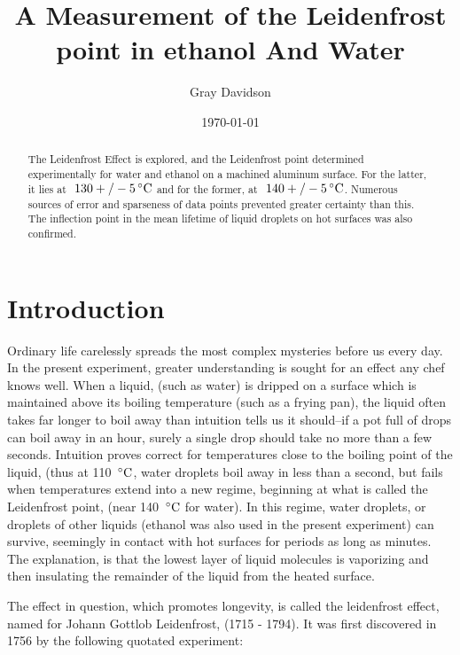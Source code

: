 \documentclass[aps,pre,twocolumn,nofootinbib]{revtex4}
\begin{document}
\title{A Measurement of the Leidenfrost point in ethanol And Water}

\author{Gray Davidson}
\date{\today}

\begin{abstract}  
The Leidenfrost Effect is explored, and the Leidenfrost point determined experimentally for water and ethanol on a machined aluminum surface.  For the latter, it lies at $~130 +/- 5\,^{\circ}{\rm C}$ and for the former, at $~140 +/- 5\,^{\circ}{\rm C}$.  Numerous sources of error and sparseness of data points prevented greater certainty than this.  The inflection point in the mean lifetime of liquid droplets on hot surfaces was also confirmed.  

\end{abstract}
\maketitle

\section{Introduction}
Ordinary life carelessly spreads the most complex mysteries before us every day.  In the present experiment, greater understanding is sought for an effect any chef knows well.  When a liquid, (such as water) is dripped on a surface which is maintained above its boiling temperature (such as a frying pan), the liquid often takes far longer to boil away than intuition tells us it should--if a pot full of drops can boil away in an hour, surely a single drop should take no more than a few seconds.  Intuition proves correct for temperatures close to the boiling point of the liquid, (thus at 110 $\,^{\circ}{\rm C}$, water droplets boil away in less than a second, but fails when temperatures extend into a new regime, beginning at what is called the Leidenfrost point, (near 140 $\,^{\circ}{\rm C}$ for water).  In this regime, water droplets, or droplets of other liquids (ethanol was also used in the present experiment) can survive, seemingly in contact with hot surfaces for periods as long as minutes.  The explanation, \cite{Self_Propelled_Leidenfrost_Droplets} is that the lowest layer of liquid molecules is vaporizing and then insulating the remainder of the liquid from the heated surface.  

The effect in question, which promotes longevity, is called the leidenfrost effect, named for Johann Gottlob Leidenfrost, (1715 - 1794).  It was first discovered in 1756 by the following quotated experiment: 
\end{document}
